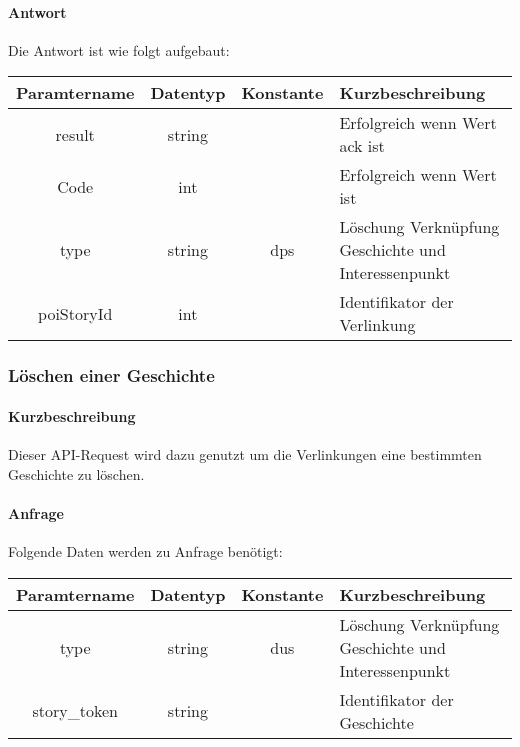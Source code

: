\paragraph{Antwort}Die Antwort ist wie folgt aufgebaut:
\begin{table}[H]
	\begin{tabular}{|c|c|c|p{6.5cm}|}
		\hline
		\textbf{Paramtername} & \textbf{Datentyp} & \textbf{Konstante} & \textbf{Kurzbeschreibung}                                                                                               \\ \hline
		result              & string           &                 & Erfolgreich wenn Wert {\glqq ack\grqq} ist \\ \hline
		Code                & int              &                 & Erfolgreich wenn Wert {\glqq 0\grqq} ist \\ \hline
		type                & string           & dps             & Löschung Verknüpfung Geschichte und Interessenpunkt \\ \hline
		poiStoryId          & int              &                 & Identifikator der Verlinkung \\ \hline
	\end{tabular}
\end{table}
\subsubsection{Löschen einer Geschichte}
\paragraph{Kurzbeschreibung}Dieser API-Request wird dazu genutzt um die Verlinkungen eine bestimmten Geschichte zu löschen.
\paragraph{Anfrage}Folgende Daten werden zu Anfrage benötigt:
\begin{table}[H]
	\begin{tabular}{|c|c|c|p{6.5cm}|}
		\hline
		\textbf{Paramtername} & \textbf{Datentyp} & \textbf{Konstante} & \textbf{Kurzbeschreibung}                                                                                               \\ \hline
		type                & string            & dus                & Löschung Verknüpfung Geschichte und Interessenpunkt \\ \hline
		story\_token        & string            &                    & Identifikator der Geschichte \\ \hline
	\end{tabular}
\end{table}
